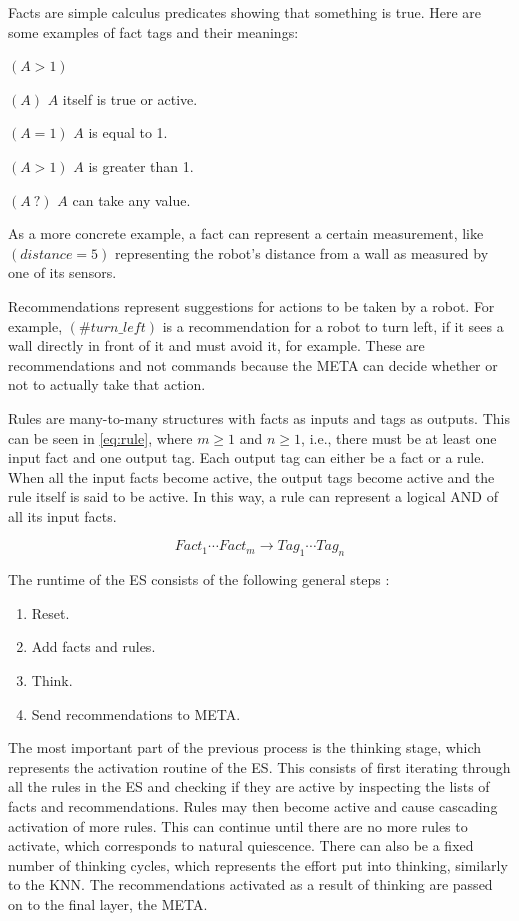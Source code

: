 \documentclass[titlepage,11pt]{article}
\begin{document}
Facts are simple calculus predicates showing that something is true. Here are some examples of fact tags and their meanings:

\begin{labeling}{$(A > 1)$}
	\item[$(A)$] $A$ itself is true or active.
	\item[$(A = 1)$] $A$ is equal to 1.
	\item[$(A > 1)$] $A$ is greater than 1.
	\item[$(A \ ?)$] $A$ can take any value.
\end{labeling}

As a more concrete example, a fact can represent a certain measurement, like $(distance = 5)$ representing the robot's distance from a wall as measured by one of its sensors.

Recommendations represent suggestions for actions to be taken by a robot. For example, $(\#turn\_left)$ is a recommendation for a robot to turn left, if it sees a wall directly in front of it and must avoid it, for example. These are recommendations and not commands because the META can decide whether or not to actually take that action.

Rules are many-to-many structures with facts as inputs and tags as outputs. This can be seen in \autoref{eq:rule}, where $m \geq 1$ and $n \geq 1$, i.e., there must be at least one input fact and one output tag. Each output tag can either be a fact or a rule. When all the input facts become active, the output tags become active and the rule itself is said to be active. In this way, a rule can represent a logical AND of all its input facts.

\begin{equation} \label{eq:rule}
Fact_1 \cdots Fact_m \rightarrow Tag_1 \cdots Tag_n
\end{equation}

The runtime of the ES consists of the following general steps \cite{vybihal-expert}:

\begin{enumerate}
	\item Reset.
	\item Add facts and rules.
	\item Think.
	\item Send recommendations to META.
\end{enumerate}

The most important part of the previous process is the thinking stage, which represents the activation routine of the ES. This consists of first iterating through all the rules in the ES and checking if they are active by inspecting the lists of facts and recommendations. Rules may then become active and cause cascading activation of more rules. This can continue until there are no more rules to activate, which corresponds to natural quiescence. There can also be a fixed number of thinking cycles, which represents the effort put into thinking, similarly to the KNN. The recommendations activated as a result of thinking are passed on to the final layer, the META.
\end{document}
